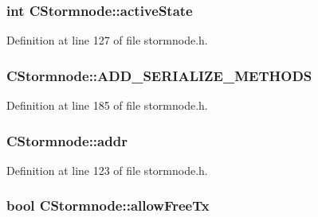 \subsubsection[{active\+State}]{\setlength{\rightskip}{0pt plus 5cm}int C\+Stormnode\+::active\+State}\label{class_c_stormnode_a288aca8c8cbd786c2188ae5bc39c642a}


Definition at line 127 of file stormnode.\+h.

\hypertarget{class_c_stormnode_a7dabb832beef5f761352a4799c55bbec}{}
\subsubsection[{A\+D\+D\+\_\+\+S\+E\+R\+I\+A\+L\+I\+Z\+E\+\_\+\+M\+E\+T\+H\+O\+D\+S}]{\setlength{\rightskip}{0pt plus 5cm}C\+Stormnode\+::\+A\+D\+D\+\_\+\+S\+E\+R\+I\+A\+L\+I\+Z\+E\+\_\+\+M\+E\+T\+H\+O\+D\+S}\label{class_c_stormnode_a7dabb832beef5f761352a4799c55bbec}


Definition at line 185 of file stormnode.\+h.

\hypertarget{class_c_stormnode_a31e0681a92d1f4d0da756b680c695d66}{}
\subsubsection[{addr}]{ C\+Stormnode\+::addr}\label{class_c_stormnode_a31e0681a92d1f4d0da756b680c695d66}


Definition at line 123 of file stormnode.\+h.

\hypertarget{class_c_stormnode_a1d256b346d4bee1e4d7a68db4c5e659f}{}
\subsubsection[{allow\+Free\+Tx}]{\setlength{\rightskip}{0pt plus 5cm}bool C\+Stormnode\+::allow\+Free\+Tx}\label{class_c_stormnode_a1d256b346d4bee1e4d7a68db4c5e659f}


